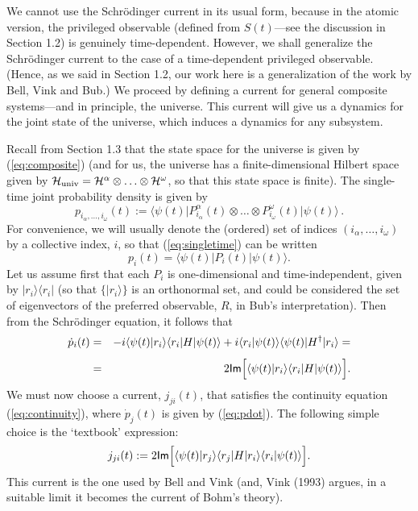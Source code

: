 \documentclass[12pt]{article}
\newcommand{\be}{\begin{equation}}
\newcommand{\ee}{\end{equation}}
\newcommand{\cH}{\cal{H}}                                       %
\newcommand{\ga}{\alpha}                                        %
\newcommand{\gw}{\omega}                                        %
\renewcommand{\Im}{\mbox{{\sf Im}}}                             %
\newcommand{\bra}[1]{\langle #1\vert}                           %
\newcommand{\ket}[1]{\vert #1\rangle}                           %
\newcommand{\braket}[2]{\langle #1\vert #2\rangle}              %
\begin{document}
We cannot use the Schr\"odinger current in its usual form, because in 
the atomic version, the privileged observable (defined from 
$S(t)$---see the discussion in Section 1.2) is genuinely 
time-dependent.  However, we shall generalize the Schr\"odinger 
current to the case of a time-dependent privileged observable.  
(Hence, as we said in Section 1.2, our work here is a generalization 
of the work by Bell, Vink and Bub.) We proceed by defining a current 
for general composite systems---and in principle, the universe.  This 
current will give us a dynamics for the joint state of the universe, 
which induces a dynamics for any subsystem.

Recall from Section 1.3 that the state space for the universe is given 
by (\ref{eq:composite}) (and for us, the universe has a 
finite-dimensional Hilbert space given by $\cH_{\mbox{\scriptsize 
univ}} = \cH^\ga \otimes \ldots \otimes \cH^\gw$, so that this state 
space is finite).  The single-time joint probability density is given 
by
\be
  \label{eq:singletime}
  p_{i_\ga, \ldots , i_\gw}(t) :=
  \bra{\psi(t)}
  P^\ga_{i_\ga}(t) \otimes \ldots \otimes P^\gw_{i_\gw}(t)
  \ket{\psi(t)}\,.
\ee
For convenience, we will usually denote the (ordered) set of indices
$(i_\ga, \ldots , i_\gw)$ by a collective index, $i$, so
that (\ref{eq:singletime}) can be written
\be
  \label{eq:easysingletime}
  p_i(t) =
  \bra{\psi(t)} P_i(t) \ket{\psi(t)}.
\ee
Let us assume first that each $P_i$ is one-dimensional and 
time-independent, given by $\ket{r_i}\bra{r_i}$ (so that 
$\{\ket{r_i}\}$ is an orthonormal set, and could be considered the set 
of eigenvectors of the preferred observable, $R$, in Bub's 
interpretation).  Then from the Schr\"odinger equation, it follows 
that
\begin{eqnarray}
  \dot{p}_i(t) & = & -i\braket{\psi(t)}{r_i}\bra{r_i} H \ket{\psi(t)} + 
  i\braket{r_i}{\psi(t)}\bra{\psi(t)} H^{\dagger} \ket{r_i}= \nonumber 
  \\[1ex] 
  \ & = & 2 \Im \Big[ \braket{\psi(t)}{r_i}\bra{r_i}H 
  \ket{\psi(t)} \Big].  \label{eq:pdot}
\end{eqnarray}
We must now choose a current, $j_{ji}(t)$, that satisfies the
continuity equation (\ref{eq:continuity}), where $\dot{p}_j(t)$ is
given by (\ref{eq:pdot}).  The following simple choice is the
`textbook' expression:
\be
  \label{eq:current1}
  j_{ji}(t) := 2 \Im \Big[
  \braket{\psi(t)}{r_j}\bra{r_j}H\ket{r_i}\braket{r_i}{\psi(t)} \Big].
\ee
This current is the one used by Bell and Vink (and, Vink (1993)
argues, in a suitable limit it becomes the current of Bohm's theory).
\end{document}
